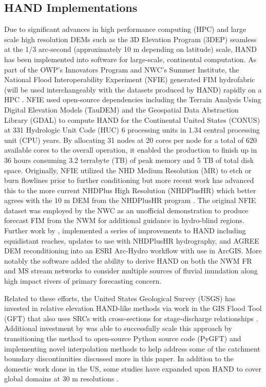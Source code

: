 \subsection{HAND Implementations}
%
Due to significant advances in high performance computing (HPC) and large scale high resolution DEMs such as the 3D Elevation Program (3DEP) seamless at the 1/3 arc-second (approximately 10 m depending on latitude) scale, HAND has been implemented into software for large-scale, continental computation. 
As part of the OWP's Innovators Program and NWC's Summer Institute, the National Flood Interoperability Experiment (NFIE) generated FIM hydrofabric (will be used interchangeably with the datasets produced by HAND) rapidly on a HPC \cite{maidment2017conceptual,liu2016cybergis}. 
NFIE used open-source dependencies including the Terrain Analysis Using Digital Elevation Models (TauDEM) \cite{tarboton2005terrain} and the Geospatial Data Abstraction Library (GDAL) \cite{warmerdam2008geospatial} to compute HAND for the Continental United States (CONUS) at 331 Hydrologic Unit Code (HUC) 6 processing units in 1.34 central processing unit (CPU) years.
By allocating 31 nodes at 20 cores per node for a total of 620 available cores to the overall operation, it enabled the production to finish up in 36 hours consuming 3.2 terrabyte (TB) of peak memory and 5 TB of total disk space.
Originally, NFIE utilized the NHD Medium Resolution (MR) to etch or burn flowlines prior to further conditioning but more recent work has advanced this to the more current NHDPlus High Resolution (NHDPlusHR) which better agrees with the 10 m DEM from the NHDPlusHR program \cite{liu2020height}. 
The original NFIE dataset was employed by the NWC as an unofficial demonstration to produce forecast FIM from the NWM for additional guidance in hydro-blind regions.
Further work by , implemented a series of improvements to HAND including equidistant reaches, updates to use with NHDPlusHR hydrography, and AGREE DEM reconditioning \cite{hellweger1997agree} into an ESRI Arc-Hydro workflow with use in ArcGIS. 
More notably the software added the ability to derive HAND on both the NWM FR and MS stream networks to consider multiple sources of fluvial inundation along high impact rivers of primary forecasting concern.

Related to these efforts, the United States Geological Survey (USGS) has invested in relative elevation HAND-like methods via work in the GIS Flood Tool (GFT) that also uses SRCs with cross-sections for stage-discharge relationships \cite{verdin2016software}.
Additional investment by  was able to successfully scale this approach by transitioning the method to open-source Python source code (PyGFT) and implementing novel interpolation methods to help address some of the catchment boundary discontinuities discussed more in this paper.
In addition to the domestic work done in the US, some studies have expanded upon HAND to cover global domains at 30 m resolutions \cite{yamazaki2019merit,donchyts2016global}.
%
